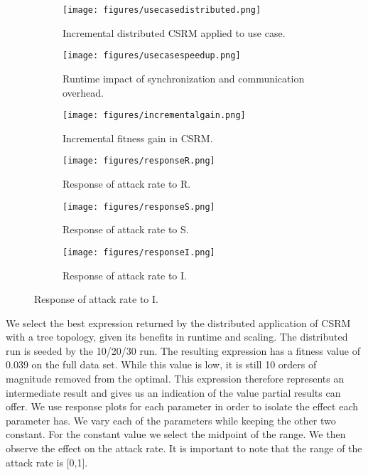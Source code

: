 \begin{figure}
    \begin{subfigure}{0.5\textwidth}
        \texttt{[image: figures/usecasedistributed.png]}
		\caption{Incremental distributed CSRM applied to use case.}
		\label{fig:usecasedistributed}
    \end{subfigure}
    \begin{subfigure}{0.5\textwidth}
        \texttt{[image: figures/usecasespeedup.png]}
		\caption{Runtime impact of synchronization and communication overhead.}
		\label{fig:usecasespeedup}
    \end{subfigure}
        \begin{subfigure}{0.5\textwidth}
        \texttt{[image: figures/incrementalgain.png]}
        \caption{Incremental fitness gain in CSRM.}
        \label{fig:incrementalgain}
    \end{subfigure}
        \begin{subfigure}{0.5\textwidth}
        \texttt{[image: figures/responseR.png]}
        \caption{Response of attack rate to R.}
    \end{subfigure}
    \begin{subfigure}{0.5\textwidth}
        \texttt{[image: figures/responseS.png]}
        \caption{Response of attack rate to S.}
    \end{subfigure}
        \begin{subfigure}{0.5\textwidth}
        \texttt{[image: figures/responseI.png]}
        \caption{Response of attack rate to I.}
        \label{fig:usecaseresponseplots}
    \end{subfigure}
\end{figure}
We select the best expression returned by the distributed application of CSRM with a tree topology, given its benefits in runtime and scaling. The distributed run is seeded by the 10/20/30 run. The resulting expression has a fitness value of 0.039 on the full data set. While this value is low, it is still 10 orders of magnitude removed from the optimal. This expression therefore represents an intermediate result and gives us an indication of the value partial results can offer.
We use response plots for each parameter in order to isolate the effect each parameter has. We vary each of the parameters while keeping the other two constant. For the constant value we select the midpoint of the range. We then observe the effect on the attack rate. It is important to note that the range of the attack rate is [0,1]. 
